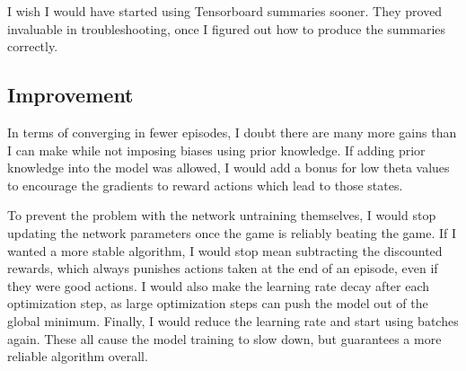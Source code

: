 \documentclass[12pt,a4paper]{article}
\begin{document}
I wish I would have started using Tensorboard summaries sooner. They proved invaluable in troubleshooting, once I figured out how to produce the summaries correctly.

\subsection*{Improvement}

In terms of converging in fewer episodes, I doubt there are many more gains than I can make while not imposing biases using prior knowledge. If adding prior knowledge into the model was allowed, I would add a bonus for low theta values to encourage the gradients to reward actions which lead to those states.

To prevent the problem with the network untraining themselves, I would stop updating the network parameters once the game is reliably beating the game. If I wanted a more stable algorithm, I would stop mean subtracting the discounted rewards, which always punishes actions taken at the end of an episode, even if they were good actions. I would also make the learning rate decay after each optimization step, as large optimization steps can push the model out of the global minimum. Finally, I would reduce the learning rate and start using batches again. These all cause the model training to slow down, but guarantees a more reliable algorithm overall.


%
%

\printbibliography
\end{document}
